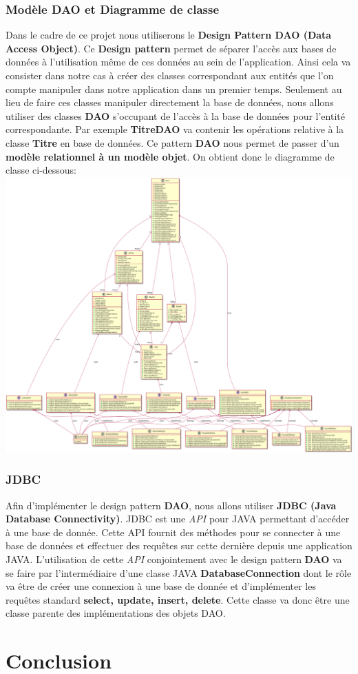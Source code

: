 \documentclass[a4paper,12pt, french]{report}
\begin{document}
  \subsection{Modèle DAO et Diagramme de classe}
    Dans le cadre de ce projet nous utiliserons le \textbf{Design Pattern DAO (Data Access Object)}. Ce \textbf{Design pattern} permet de séparer l'accès aux bases de données à l'utilisation même de ces données au sein de l'application. Ainsi cela va consister dans notre cas à créer des classes correspondant aux entités que l'on compte manipuler dans notre application dans un premier temps. Seulement au lieu de faire ces classes manipuler directement la base de données, nous allons utiliser des classes \textbf{DAO} s'occupant de l'accès à la base de données pour l'entité correspondante. Par exemple \textbf{TitreDAO} va contenir les opérations relative à la classe \textbf{Titre} en base de données. Ce pattern \textbf{DAO} nous permet de passer d'un \textbf{modèle relationnel à un modèle objet}. On obtient donc le diagramme de classe ci-dessous:
    \includegraphics[scale=0.2]{class_diagram.png}
  \subsection{JDBC}
    Afin d'implémenter le design pattern \textbf{DAO}, nous allons utiliser \textbf{JDBC (Java Database Connectivity)}. JDBC est une \emph{API} pour JAVA permettant d'accéder à une base de donnée. Cette API fournit des méthodes pour se connecter à une base de données et effectuer des requêtes sur cette dernière depuis une application JAVA. L'utilisation de cette \emph{API} conjointement avec le design pattern \textbf{DAO} va se faire par l'intermédiaire d'une classe JAVA \textbf{DatabaseConnection} dont le rôle va être de créer une connexion à une base de donnée et d'implémenter les requêtes standard \textbf{select, update, insert, delete}. Cette classe va donc être une classe parente des implémentations des objets DAO.
\chapter*{Conclusion}
\end{document}
